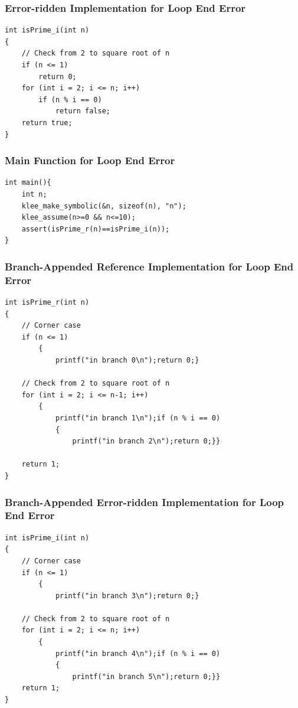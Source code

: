 \subsubsection{Error-ridden Implementation for Loop End Error}
\begin{verbatim}
int isPrime_i(int n)
{
    // Check from 2 to square root of n
    if (n <= 1)
		return 0;
    for (int i = 2; i <= n; i++)
        if (n % i == 0)
            return false;
    return true;
}
\end{verbatim}
\subsubsection{Main Function for Loop End Error}
\begin{verbatim}
int main(){
    int n;
    klee_make_symbolic(&n, sizeof(n), "n");
    klee_assume(n>=0 && n<=10);
    assert(isPrime_r(n)==isPrime_i(n));
}
\end{verbatim}
\subsubsection{Branch-Appended Reference Implementation for Loop End Error}
\begin{verbatim}
int isPrime_r(int n)
{
    // Corner case
    if (n <= 1)
        {
            printf("in branch 0\n");return 0;}

    // Check from 2 to square root of n
    for (int i = 2; i <= n-1; i++)
        {
            printf("in branch 1\n");if (n % i == 0)
            {
                printf("in branch 2\n");return 0;}}

    return 1;
}
\end{verbatim}

\subsubsection{Branch-Appended Error-ridden Implementation for Loop End Error}

\begin{verbatim}
int isPrime_i(int n)
{
    // Corner case
    if (n <= 1)
        {
            printf("in branch 3\n");return 0;}

    // Check from 2 to square root of n
    for (int i = 2; i <= n; i++)
        {
            printf("in branch 4\n");if (n % i == 0)
            {
                printf("in branch 5\n");return 0;}}
    return 1;
}
\end{verbatim}
